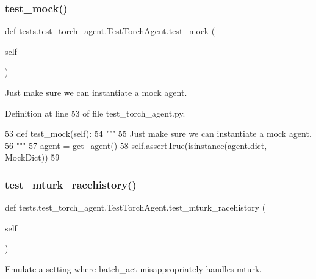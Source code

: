 \subsubsection{\texorpdfstring{test\+\_\+mock()}{test\_mock()}}
{\footnotesize\ttfamily def tests.\+test\+\_\+torch\+\_\+agent.\+Test\+Torch\+Agent.\+test\+\_\+mock (\begin{DoxyParamCaption}\item[{}]{self }\end{DoxyParamCaption})}

\begin{DoxyVerb}Just make sure we can instantiate a mock agent.
\end{DoxyVerb}
 

Definition at line 53 of file test\+\_\+torch\+\_\+agent.\+py.


\begin{DoxyCode}
53     \textcolor{keyword}{def }test\_mock(self):
54         \textcolor{stringliteral}{"""}
55 \textcolor{stringliteral}{        Just make sure we can instantiate a mock agent.}
56 \textcolor{stringliteral}{        """}
57         agent = \hyperlink{namespacetests_1_1test__torch__agent_ae929d109305aaea29fbfa13ecf1f32e9}{get\_agent}()
58         self.assertTrue(isinstance(agent.dict, MockDict))
59 
\end{DoxyCode}
\mbox{\label{classtests_1_1test__torch__agent_1_1TestTorchAgent_a9954f92efc8cc7a9770f90f3a297d397}} 
\subsubsection{\texorpdfstring{test\+\_\+mturk\+\_\+racehistory()}{test\_mturk\_racehistory()}}
{\footnotesize\ttfamily def tests.\+test\+\_\+torch\+\_\+agent.\+Test\+Torch\+Agent.\+test\+\_\+mturk\+\_\+racehistory (\begin{DoxyParamCaption}\item[{}]{self }\end{DoxyParamCaption})}

\begin{DoxyVerb}Emulate a setting where batch_act misappropriately handles mturk.
\end{DoxyVerb}
 

